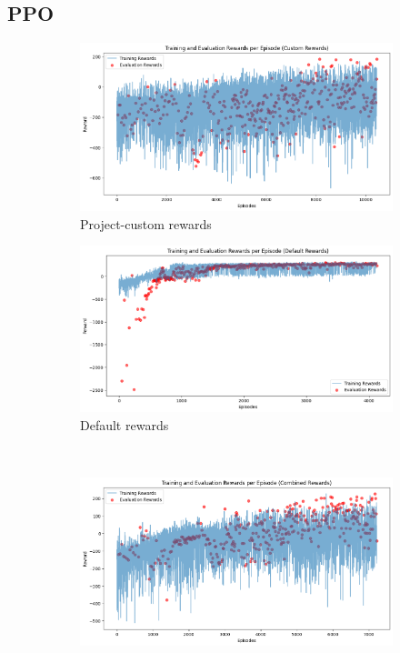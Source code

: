 \documentclass[a4paper, 11pt]{article}
\begin{document}
	\subsection{PPO}
	\begin{figure}[H]
		\begin{center}
		\begin{subfigure}{0.48\textwidth}
			\includegraphics[width=\linewidth]{ppo_figures/custom_env_results.png}
			\caption{Project-custom rewards}
			\label{fig:ppo_rewcust}
		\end{subfigure}\hfill 
		\begin{subfigure}{0.48\textwidth}
		\includegraphics[width=\linewidth]{ppo_figures/default_env_results.png}
		\caption{Default rewards}
		\label{fig:ppo_rewdef}
		\end{subfigure}\\ 
		\begin{subfigure}{0.48\textwidth}
		\includegraphics[width=\linewidth]{ppo_figures/combined_env_results.png}

\end{subfigure}
\end{center}
\end{figure}
\end{document}
